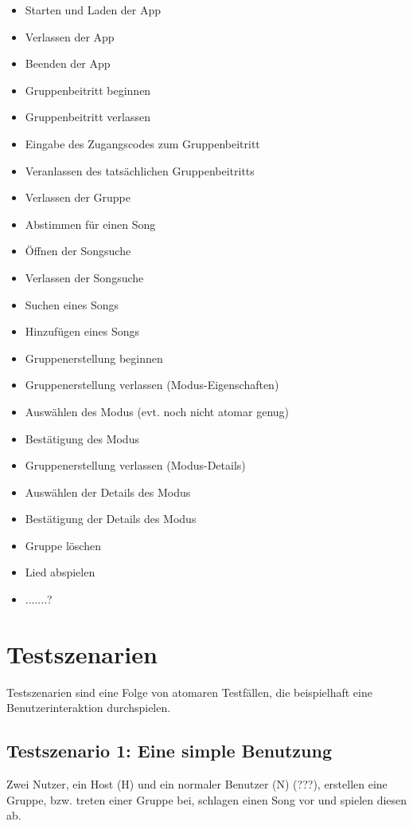 \documentclass[oneside, ngerman]{sdqtechreport}
\begin{document}
\begin{itemize}
    \item Starten und Laden der App
    \item Verlassen der App
    \item Beenden der App
    \item Gruppenbeitritt beginnen
    \item Gruppenbeitritt verlassen
    \item Eingabe des Zugangscodes zum Gruppenbeitritt
    \item Veranlassen des tatsächlichen Gruppenbeitritts
    \item Verlassen der Gruppe
    \item Abstimmen für einen Song
    \item Öffnen der Songsuche
    \item Verlassen der Songsuche
    \item Suchen eines Songs
    \item Hinzufügen eines Songs
    \item Gruppenerstellung beginnen
    \item Gruppenerstellung verlassen (Modus-Eigenschaften)
    \item Auswählen des Modus (evt. noch nicht atomar genug)
    \item Bestätigung des Modus
    \item Gruppenerstellung verlassen (Modus-Details)
    \item Auswählen der Details des Modus
    \item Bestätigung der Details des Modus
    \item Gruppe löschen
    \item Lied abspielen
    \item .......?
\end{itemize}

\section{Testszenarien}
\label{sec:Tests:Testszenarien}

Testszenarien sind eine Folge von atomaren Testfällen, die beispielhaft eine Benutzerinteraktion durchspielen.

\subsection{Testszenario 1: Eine simple Benutzung}
\label{subsec:Tests:Testszenarien:1}
Zwei Nutzer, ein Host (H) und ein normaler Benutzer (N) (???), erstellen eine Gruppe, bzw. treten einer Gruppe bei, schlagen einen Song vor und spielen diesen ab.
\end{document}
